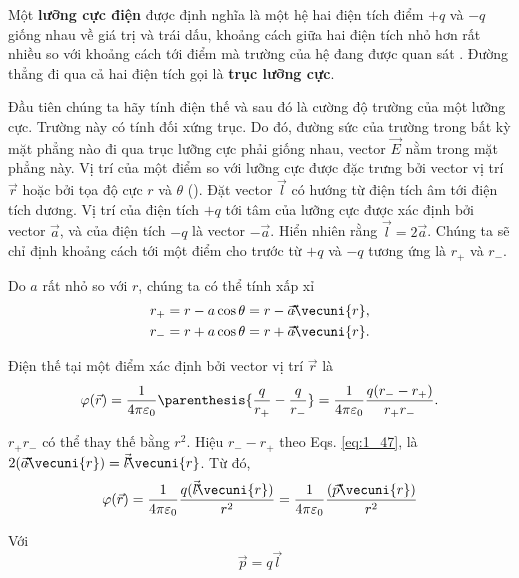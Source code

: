 Một \textbf{lưỡng cực điện} được định nghĩa là một hệ hai điện tích điểm $+q$ và $-q$ giống nhau về giá trị và trái dấu, khoảng cách giữa hai điện tích nhỏ hơn rất nhiều so với khoảng cách tới điểm mà trường của hệ đang được quan sát . Đường thẳng đi qua cả hai điện tích gọi là  \textbf{trục lưỡng cực}.

Đầu tiên chúng ta hãy tính điện thế và sau đó là cường độ trường của một lưỡng cực. Trường này có tính đối xứng trục. Do đó, đường sức của trường trong bất kỳ mặt phẳng nào đi qua trục lưỡng cực phải giống nhau, vector $\vec{E}$ nằm trong mặt phẳng này. Vị trí của một điểm so với lưỡng cực được đặc trưng bởi vector vị trí $\vec{r}$ hoặc bởi tọa độ cực $r$ và $\theta$ (). Đặt vector $\vec{l}$ có hướng từ điện tích âm tới điện tích dương. Vị trí của điện tích  $+q$ tới tâm của lưỡng cực được xác định bởi vector $\vec{a}$, và của điện tích $-q$ là vector $-\vec{a}$. Hiển nhiên rằng $\vec{l}=2\vec{a}$. Chúng ta sẽ chỉ định khoảng cách tới một điểm cho trước từ $+q$ và $-q$ tương ứng là $r_+$ và $r_-$.

Do $a$ rất nhỏ so với $r$, chúng ta có thể tính xấp xỉ
\begin{equation}\label{eq:1_47}
\begin{split}
	r_+ &= r - a\cos\theta = r - \vec{a}\!\vec{\cdot}\!\vecuni{r},\\
	r_- &= r + a\cos\theta = r + \vec{a}\!\vec{\cdot}\!\vecuni{r}.
\end{split}
\end{equation}

Điện thế tại một điểm xác định bởi vector vị trí $\vec{r}$ là
\begin{equation*}
	\varphi(\vec{r}) = \frac{1}{4\pi\varepsilon_0} \parenthesis{
	\frac{q}{r_+} - \frac{q}{r_-}
	} = \frac{1}{4\pi\varepsilon_0} \frac{q(r_- - r_+)}{r_+ r_-}.
\end{equation*}

\noindent
$r_+r_-$ có thể thay thế bằng $r^2$. Hiệu $r_--r_+$ theo Eqs. \eqref{eq:1_47}, là $2(\vec{a}\!\vec{\cdot}\!\vecuni{r})=\vec{l}\!\vec{\cdot}\!\vecuni{r}$. Từ đó,
\begin{equation}\label{eq:1_48}
	\varphi(\vec{r}) = \frac{1}{4\pi\varepsilon_0} \frac{q(\vec{l}\!\vec{\cdot}\!\vecuni{r})}{r^2} = \frac{1}{4\pi\varepsilon_0} \frac{(\vec{p}\!\vec{\cdot}\!\vecuni{r})}{r^2}
\end{equation}

\noindent
Với
\vspace{-5pt}
\begin{equation}\label{eq:1_49}
	\vec{p} = q\vec{l}
\end{equation}

